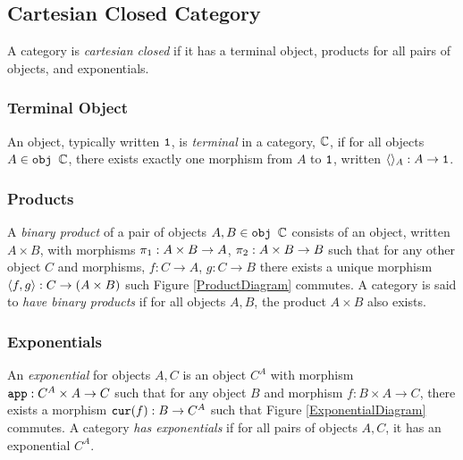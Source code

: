\documentclass{Report}
\begin{document}
\subsection{Cartesian Closed Category}\label{CCC}
A category is \textit{cartesian closed} if it has a terminal object, products for all pairs of objects, and exponentials.

\subsubsection{Terminal Object}
An object, typically written $\texttt{1}$, is \textit{terminal} in a category, $\mathbb{C}$, if for all objects $A\in\texttt{obj }\mathbb{C}$, there exists exactly one morphism from $A$ to $\texttt{1}$, written $\langle\rangle_{A}: A \rightarrow \texttt{1}$.

\subsubsection{Products}
A \textit{binary product} of a pair of objects $A, B\in\texttt{obj }\mathbb{C}$ consists of an object, written $A \times B$, with morphisms $\pi_1: A\times B\rightarrow A$, $\pi_2: A\times B \rightarrow B$ such that for any other object $C$ and morphisms, $f: C\rightarrow A$, $g: C\rightarrow B$ there exists a unique morphism $\langle f, g\rangle: C \rightarrow (A\times B)$ such Figure \ref{ProductDiagram} commutes.
A category is said to \textit{have binary products} if for all objects $A, B$, the product $A\times B$ also exists.

\subsubsection{Exponentials}
An \textit{exponential} for objects $A, C$ is an object $C^A$ with morphism $\texttt{app}: C^A\times A \rightarrow C$ such that for any object $B$ and morphism $f: B\times A \rightarrow C$, there exists a morphism $\texttt{cur}(f): B \rightarrow C^A$ such that Figure \ref{ExponentialDiagram} commutes. A category \textit{has exponentials} if for all pairs of objects $A, C$, it has an exponential $C^A$.
\end{document}
